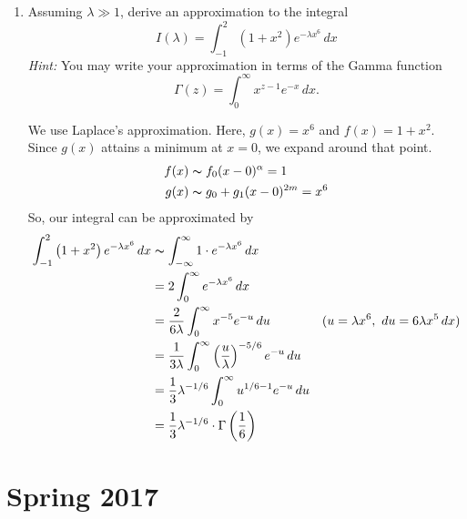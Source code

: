 \documentclass[10pt,letterpaper]{report}
\renewcommand{\chaptermark}[1]{%
\markboth{#1}{}}
\begin{document}
\begin{enumerate}
\item \begin{qbox}
Assuming $\lambda \gg 1$, derive an approximation to the integral
\[
I(\lambda) = \int_{-1}^2 \left(1 + x^2\right)e^{-\lambda x^6}\,dx
\]
\textit{Hint:} You may write your approximation in terms of the Gamma function
\[
\Gamma(z) = \int_0^\infty x^{z-1}e^{-x}\,dx.
\]
\end{qbox}
We use Laplace's approximation. Here, $g(x) = x^6$ and $f(x) = 1 + x^2$. Since $g(x)$ attains a minimum at $x = 0$, we expand around that point.
\begin{align*}
f(x) &\thicksim f_0(x - 0)^\alpha = 1 \\
g(x) &\thicksim g_0 + g_1(x - 0)^{2m} = x^6
\end{align*}
So, our integral can be approximated by
\begin{align*}
\int_{-1}^2 \left(1 + x^2\right)e^{-\lambda x^6}\,dx &\thicksim \int_{-\infty}^\infty 1\cdot e^{-\lambda x^6}\,dx \\
&=
2\int_0^\infty e^{-\lambda x^6}\,dx
\\
&=
\frac{2}{6\lambda}\int_0^\infty x^{-5}e^{-u}\,du &(u = \lambda x^6,\ du = 6\lambda x^5\,dx)
\\
&=
\frac{1}{3\lambda}\int_0^\infty \left(\frac{u}{\lambda}\right)^{-5/6}e^{-u}\,du
\\
&=
\frac{1}{3}\lambda^{-1/6}\int_0^\infty u^{1/6 - 1}e^{-u}\,du
\\
&=
\frac{1}{3}\lambda^{-1/6}\cdot\Gamma\left(\frac{1}{6}\right)
\end{align*}

\end{enumerate}

\chapter*{Spring 2017}
\chaptermark{Spring 2017}
\end{document}

